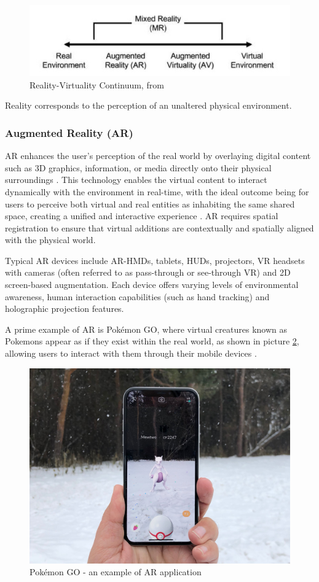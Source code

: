 \begin{figure}[h]
    \centering
    \includegraphics[width=0.6\linewidth]{figs/mixed-reality-continuum.jpg}
    \caption{Reality-Virtuality Continuum, from \cite{milgram1994}}
    \label{f:real-virtual-continuum}
\end{figure}

Reality corresponds to the perception of an unaltered physical environment.

\subsubsection{Augmented Reality (\ac{AR})}
    \ac{AR} enhances the user's perception of the real world by overlaying digital content such as 3D graphics, information, or media directly 
    onto their physical surroundings \cite{liu2022digitaltwin}. 
    This technology enables the virtual content to interact dynamically with the environment in real-time, with the ideal outcome being for users
    to perceive both virtual and real entities as inhabiting the same shared space, creating a unified and interactive experience \cite{Azuma1997}.
    \ac{AR} requires spatial registration to ensure that virtual additions are contextually and spatially aligned with the physical world.

    Typical \ac{AR} devices include \ac{AR}-\ac{HMDs}, tablets, \ac{HUDs}, projectors, \ac{VR} headsets with cameras (often referred to as pass-through or see-through VR) and 2D screen-based augmentation. Each device offers varying levels of environmental awareness, human interaction capabilities (such as hand tracking) and holographic projection features.


    A prime example of \ac{AR} is Pokémon GO, where virtual creatures known as Pokemons appear as if they exist within the real world, as shown in picture
    \ref{f:pokemon-go}, allowing users to interact with them through their mobile devices \cite{whatismixedreality}.

    \begin{figure}[h]
        \centering
        \includegraphics[width=0.6\linewidth]{figs/mewtwo.jpg}
        \caption{Pokémon GO - an example of \ac{AR} application}
        \label{f:pokemon-go}
    \end{figure}


